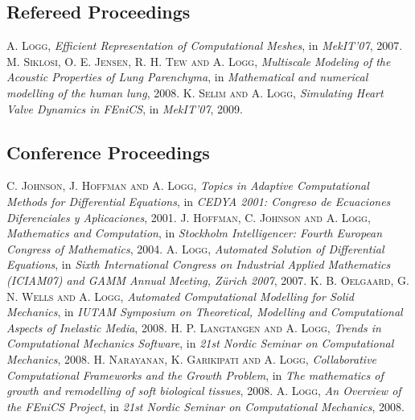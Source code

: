\begin{thebibliography}{99}
\subsection*{Refereed Proceedings}
 {\textsc{A. Logg},
\textit{Efficient Representation of Computational Meshes},
in \textit{MekIT'07},
2007.
}
 {\textsc{M. Siklosi, O. E. Jensen, R. H. Tew and A. Logg},
\textit{Multiscale Modeling of the Acoustic Properties of Lung Parenchyma},
in \textit{Mathematical and numerical modelling of the human lung},
2008.
}
 {\textsc{K. Selim and A. Logg},
\textit{Simulating Heart Valve Dynamics in FEniCS},
in \textit{MekIT'07},
2009.
}
\subsection*{Conference Proceedings}
 {\textsc{C. Johnson, J. Hoffman and A. Logg},
\textit{Topics in Adaptive Computational Methods for Differential Equations},
in \textit{CEDYA 2001: Congreso de Ecuaciones Diferenciales y Aplicaciones},
2001.
}
 {\textsc{J. Hoffman, C. Johnson and A. Logg},
\textit{Mathematics and Computation},
in \textit{Stockholm Intelligencer: Fourth European Congress of Mathematics},
2004.
}
 {\textsc{A. Logg},
\textit{Automated Solution of Differential Equations},
in \textit{Sixth International Congress on Industrial Applied Mathematics (ICIAM07) and GAMM Annual Meeting, Z\"urich 2007},
2007.
}
 {\textsc{K. B. Oelgaard, G. N. Wells and A. Logg},
\textit{Automated Computational Modelling for Solid Mechanics},
in \textit{IUTAM Symposium on Theoretical, Modelling and Computational Aspects of Inelastic Media},
2008.
}
 {\textsc{H. P. Langtangen and A. Logg},
\textit{Trends in Computational Mechanics Software},
in \textit{21st Nordic Seminar on Computational Mechanics},
2008.
}
 {\textsc{H. Narayanan, K. Garikipati and A. Logg},
\textit{Collaborative Computational Frameworks and the Growth Problem},
in \textit{The mathematics of growth and remodelling of soft biological tissues},
2008.
}
 {\textsc{A. Logg},
\textit{An Overview of the FEniCS Project},
in \textit{21st Nordic Seminar on Computational Mechanics},
2008.
}

\end{thebibliography}

